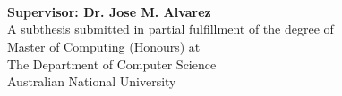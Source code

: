 
\begin{titlepage}
  \enlargethispage{2cm}
  \begin{center}
    \makeatletter
    \Huge\textbf{\@title} \\[.4cm]
    \Huge\textbf{\thesisqualifier} \\[2.5cm]
    \huge\textbf{\@author}\\
    \huge\textbf{Supervisor: Dr. Jose M. Alvarez}\\[7.5cm]
    \makeatother
    \Large A subthesis submitted in partial fulfillment of the degree of \\
    \LARGE Master of Computing (Honours) at \\
    The Department of Computer Science\\
    Australian National University \\[2cm]
    \thismonth
  \end{center}
\end{titlepage}

